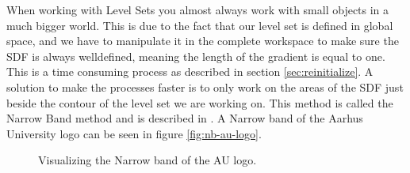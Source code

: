 When working with Level Sets you almost always work with small objects
in a much bigger world. This is due to the fact that our level set is
defined in global space, and we have to manipulate it in the complete
workspace to make sure the SDF is always welldefined, meaning the
length of the gradient is equal to one. This is a time consuming
process as described in section \vref{sec:reinitialize}. A solution to
make the processes faster is to only work on the areas of the SDF just
beside the contour of the level set we are working on. This method is
called the Narrow Band method and is described
in . A Narrow band of the Aarhus University logo can be seen in figure \vref{fig:nb-au-logo}.


\begin{figure}[h]
  \centering

  \caption{Visualizing the Narrow band of the AU logo.}
  \label{fig:nb-au-logo}
\end{figure}

